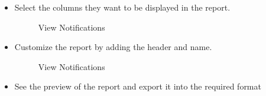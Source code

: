 \documentclass[12pt]{article}
\begin{document}
\begin{itemize}
\item Select the columns they want to be displayed in the report.
\begin{figure}[H]
\centering	
{}
\caption{View Notifications}
\end{figure}


\item Customize the report by adding the header and name.
\begin{figure}[H]
\centering	
{}
\caption{View Notifications}
\end{figure}

\item See the preview of the report and export it into the required format


\end{itemize}
\end{document}
